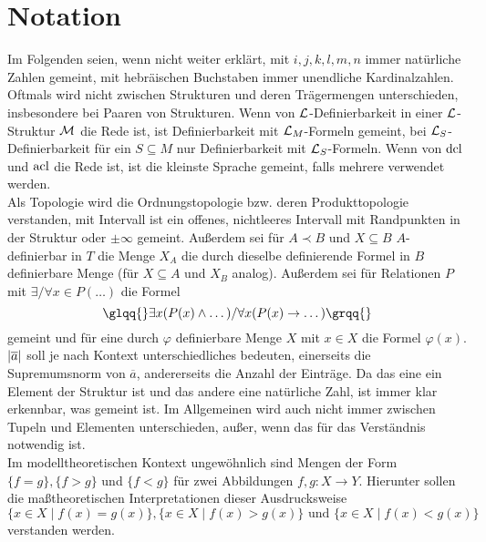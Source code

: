 \chapter*{Notation}
Im Folgenden seien, wenn nicht weiter erklärt, mit $i,j,k,l,m,n$ immer natürliche Zahlen gemeint, mit hebräischen Buchstaben immer unendliche Kardinalzahlen.\\
Oftmals wird nicht zwischen Strukturen und deren Trägermengen unterschieden, insbesondere bei Paaren von Strukturen. Wenn von $\mathcal{L}$-Definierbarkeit in einer $\mathcal{L}$-Struktur $\mathcal{M}$ die Rede ist, ist Definierbarkeit mit $\mathcal{L}_M$-Formeln gemeint, bei $\mathcal{L}_S$-Definierbarkeit für ein $S\subseteq M$ nur Definierbarkeit mit $\mathcal{L}_S$-Formeln. Wenn von $\operatorname{dcl}$ und $\operatorname{acl}$ die Rede ist, ist die kleinste Sprache gemeint, falls mehrere verwendet werden.\\
Als Topologie wird die Ordnungstopologie bzw. deren Produkttopologie verstanden, mit \glqq{}Intervall\grqq{} ist ein offenes, nichtleeres Intervall mit Randpunkten in der Struktur oder $\pm\infty$ gemeint. Außerdem sei für $A\prec B$ und $X\subseteq B$ $A$-definierbar in $T$ die Menge $X_A$ die durch dieselbe definierende Formel in $B$ definierbare Menge (für $X\subseteq A$ und $X_B$ analog). Außerdem sei für Relationen $P$ mit \glqq{}$\exists/\forall x\in P(\dots)$\grqq{} die Formel $$\glqq{}\exists x(P(x)\land\dots)/\forall x(P(x)\rightarrow\dots)\grqq{}$$ gemeint und für eine durch $\varphi$ definierbare Menge $X$ mit \glqq{}$x\in X$\grqq{} die Formel $\varphi(x)$.\\
${\left| \overline{a} \right|}$ soll je nach Kontext unterschiedliches bedeuten, einerseits die Supremumsnorm von $\overline{a}$, andererseits die Anzahl der Einträge. Da das eine ein Element der Struktur ist und das andere eine natürliche Zahl, ist immer klar erkennbar, was gemeint ist. Im Allgemeinen wird auch nicht immer zwischen Tupeln und Elementen unterschieden, außer, wenn das für das Verständnis notwendig ist.\\
Im modelltheoretischen Kontext ungewöhnlich sind Mengen der Form $\{f=g\},\{f>g\}$ und $\{f<g\}$ für zwei Abbildungen $f,g:X\rightarrow Y$. Hierunter sollen die maßtheoretischen Interpretationen dieser Ausdrucksweise $$\{x\in X\mid f(x)=g(x)\},\{x\in X\mid f(x)>g(x)\}\text{ und }\{x\in X\mid f(x)<g(x)\}$$ verstanden werden.